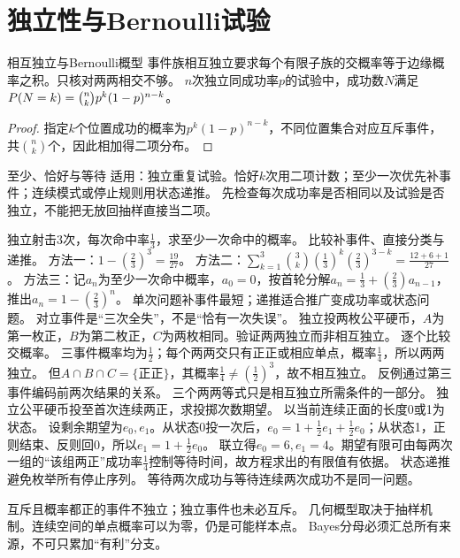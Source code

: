 \section{独立性与Bernoulli试验}\label{sec:15}
\begin{definition}{相互独立与Bernoulli概型}
事件族相互独立要求每个有限子族的交概率等于边缘概率之积。只核对两两相交不够。
$n$次独立同成功率$p$的试验中，成功数$N$满足$P(N=k)=\binom nkp^k(1-p)^{n-k}$。
\end{definition}
\begin{proof}
指定$k$个位置成功的概率为$p^k(1-p)^{n-k}$，不同位置集合对应互斥事件，共$\binom nk$个，因此相加得二项分布。
\end{proof}
\begin{method}{至少、恰好与等待}
适用：独立重复试验。恰好$k$次用二项计数；至少一次优先补事件；连续模式或停止规则用状态递推。
先检查每次成功率是否相同以及试验是否独立，不能把无放回抽样直接当二项。
\end{method}
{独立射击3次，每次命中率$\frac{1}{3}$，求至少一次命中的概率。}
{比较补事件、直接分类与递推。}
{方法一：$1-(\frac{2}{3})^3=\frac{19}{27}$。
方法二：$\sum_{k=1}^3\binom3k(\frac{1}{3})^k(\frac{2}{3})^{3-k}=\frac{12+6+1}{27}$。
方法三：记$a_n$为至少一次命中概率，$a_0=0$，按首轮分解$a_n=\frac{1}{3}+(\frac{2}{3})a_{n-1}$，推出$a_n=1-(\frac{2}{3})^n$。}
{单次问题补事件最短；递推适合推广变成功率或状态问题。}
{对立事件是“三次全失”，不是“恰有一次失误”。}
{独立投两枚公平硬币，$A$为第一枚正，$B$为第二枚正，$C$为两枚相同。验证两两独立而非相互独立。}
{逐个比较交概率。}
{三事件概率均为$\frac{1}{2}$；每个两两交只有正正或相应单点，概率$\frac{1}{4}$，所以两两独立。
但$A\cap B\cap C=\{\text{正正}\}$，其概率$\frac{1}{4}\ne(\frac{1}{2})^3$，故不相互独立。}
{反例通过第三事件编码前两次结果的关系。}
{三个两两等式只是相互独立所需条件的一部分。}
{独立公平硬币投至首次连续两正，求投掷次数期望。}
{以当前连续正面的长度0或1为状态。}
{设剩余期望为$e_0,e_1$。从状态0投一次后，$e_0=1+\frac12e_1+\frac12e_0$；从状态1，正则结束、反则回0，所以$e_1=1+\frac12e_0$。
联立得$e_0=6,e_1=4$。期望有限可由每两次一组的“该组两正”成功率$\frac{1}{4}$控制等待时间，故方程求出的有限值有依据。}
{状态递推避免枚举所有停止序列。}
{等待两次成功与等待连续两次成功不是同一问题。}
\begin{warning}
互斥且概率都正的事件不独立；独立事件也未必互斥。
几何概型取决于抽样机制。连续空间的单点概率可以为零，仍是可能样本点。
Bayes分母必须汇总所有来源，不可只累加“有利”分支。
\end{warning}

